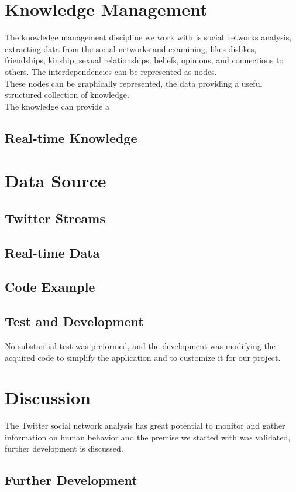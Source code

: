 \documentclass[]{article}  %
\begin{document}
\section{Knowledge Management}
The knowledge management discipline we work with is social networks analysis, extracting data from the social networks and examining; likes dislikes, friendships, kinship, sexual relationships, beliefs, opinions, and connections to others. The interdependencies can be represented as nodes. \\ These nodes can be graphically represented, the data providing a useful structured collection of knowledge. \\  The knowledge can provide a 

\subsection{Real-time Knowledge}

\section{Data Source}
\subsection{Twitter Streams}
\subsection{Real-time Data}
\subsection{Code Example}
\subsection{Test and Development}
No substantial test was preformed, and the development was modifying the acquired code to simplify the application and to customize it for our project. 
       
\section{Discussion}

The Twitter social network analysis has great potential to monitor and gather information on human behavior and the premise we started with was validated, further development is discussed. 

\subsection{Further Development}
\end{document}
